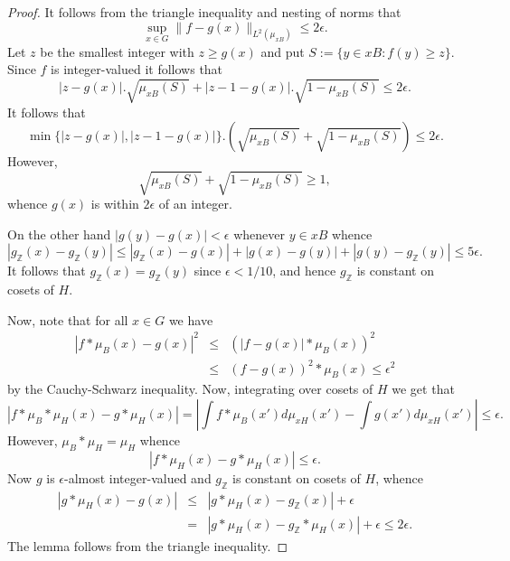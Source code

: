 \documentclass[12pt]{amsart}
\numberwithin{equation}{section}
\theoremstyle{plain}
\theoremstyle{definition}
\renewcommand{\leq}{\leqslant}
\renewcommand{\geq}{\geqslant}
\newcommand{\Z}{\mathbb{Z}}
\begin{document}
\begin{proof}
It follows from the triangle inequality and nesting of norms that
\begin{equation*}
\sup_{x \in G}{\|f-g(x)\|_{L^2(\mu_{xB})}} \leq 2\epsilon.
\end{equation*}
Let $z$ be the smallest integer with $z \geq g(x)$ and put $S:=\{y \in xB: f(y) \geq z\}$.  Since $f$ is integer-valued it follows that
\begin{equation*}
|z-g(x)|.\sqrt{\mu_{xB}(S)} + |z-1-g(x)|.\sqrt{1-\mu_{xB}(S)} \leq 2\epsilon.
\end{equation*}
It follows that
\begin{equation*}
\min\{|z-g(x)|,|z-1-g(x)|\}.(\sqrt{\mu_{xB}(S)} + \sqrt{1-\mu_{xB}(S)}) \leq 2\epsilon.
\end{equation*}
However,
\begin{equation*}
\sqrt{\mu_{xB}(S)} + \sqrt{1-\mu_{xB}(S)}\geq 1,
\end{equation*}
whence $g(x)$ is within $2\epsilon$ of an integer.

 On the other hand $|g(y)-g(x)|<\epsilon$ whenever $y\in xB$ whence
 \begin{equation*}
 |g_\Z(x)-g_\Z(y)| \leq |g_\Z(x) - g(x)| + |g(x) - g(y)| + |g(y) - g_\Z(y)| \leq 5\epsilon.
 \end{equation*}
 It follows that $g_\Z(x)=g_\Z(y)$ since $\epsilon<1/10$, and hence $g_\Z$ is constant on cosets of $H$.
 
Now, note that for all $x \in G$ we have
\begin{eqnarray*}
|f \ast \mu_B(x) - g(x)|^2 &\leq& (|f - g(x)| \ast \mu_B(x))^2\\ & \leq & (f-g(x))^2\ast \mu_B(x) \leq \epsilon^2
\end{eqnarray*}
by the Cauchy-Schwarz inequality.  Now, integrating over cosets of $H$ we get that
\begin{equation*}
|f \ast \mu_B\ast \mu_H(x) - g\ast \mu_H(x)| = |\int{f \ast \mu_B(x')d\mu_{xH}(x')} -\int{g(x')d\mu_{xH}(x')}|\leq \epsilon.
\end{equation*}
However, $\mu_B \ast \mu_H=\mu_H$ whence
\begin{equation*}
|f \ast \mu_H(x) - g \ast \mu_H(x)| \leq \epsilon.
\end{equation*}
Now $g$ is $\epsilon$-almost integer-valued and $g_\Z$ is constant on cosets of $H$, whence
\begin{eqnarray*}
|g \ast \mu_H(x) - g(x)| &\leq& |g \ast \mu_H(x) - g_\Z(x)| +\epsilon\\ & = & |g \ast \mu_H(x) - g_\Z \ast \mu_H(x)| +\epsilon \leq 2\epsilon.
\end{eqnarray*}
The lemma follows from the triangle inequality.
\end{proof}
\end{document}
